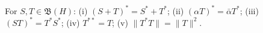 For $S, T \in \mathfrak{B}(H)$: (i) $(S+T)^* = S^* + T^*$; (ii) $(\alpha T)^* = \bar{\alpha} T^*$; (iii) $(ST)^* = T^* S^*$; (iv) $T^{**} = T$; (v) $\|T^* T\| = \|T\|^2$.
